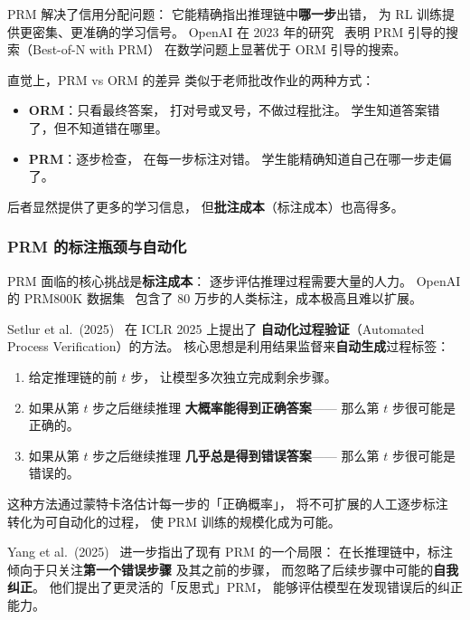 PRM 解决了信用分配问题：
它能精确指出推理链中\textbf{哪一步}出错，
为 RL 训练提供更密集、更准确的学习信号。
OpenAI 在 2023 年的研究~\cite{lightman2024lets}
表明 PRM 引导的搜索（Best-of-N with PRM）
在数学问题上显著优于 ORM 引导的搜索。

\begin{whybox}
直觉上，PRM vs ORM 的差异
类似于老师批改作业的两种方式：
\begin{itemize}[noitemsep]
  \item \textbf{ORM}：只看最终答案，
        打对号或叉号，不做过程批注。
        学生知道答案错了，但不知道错在哪里。
  \item \textbf{PRM}：逐步检查，
        在每一步标注对错。
        学生能精确知道自己在哪一步走偏了。
\end{itemize}
后者显然提供了更多的学习信息，
但\textbf{批注成本}（标注成本）也高得多。
\end{whybox}

\subsubsection{PRM 的标注瓶颈与自动化}

PRM 面临的核心挑战是\textbf{标注成本}：
逐步评估推理过程需要大量的人力。
OpenAI 的 PRM800K 数据集~\cite{lightman2024lets}
包含了 80 万步的人类标注，成本极高且难以扩展。

Setlur et al.\ (2025)~\cite{setlur2025rewarding}
在 ICLR 2025 上提出了
\textbf{自动化过程验证}（Automated Process Verification）的方法。
核心思想是利用结果监督来\textbf{自动生成}过程标签：
\begin{enumerate}[noitemsep]
  \item 给定推理链的前 $t$ 步，
        让模型多次独立完成剩余步骤。
  \item 如果从第 $t$ 步之后继续推理
        \textbf{大概率能得到正确答案}——
        那么第 $t$ 步很可能是正确的。
  \item 如果从第 $t$ 步之后继续推理
        \textbf{几乎总是得到错误答案}——
        那么第 $t$ 步很可能是错误的。
\end{enumerate}
这种方法通过蒙特卡洛估计每一步的「正确概率」，
将不可扩展的人工逐步标注
转化为可自动化的过程，
使 PRM 训练的规模化成为可能。

Yang et al.\ (2025)~\cite{yang2025beyond}
进一步指出了现有 PRM 的一个局限：
在长推理链中，标注倾向于只关注\textbf{第一个错误步骤}
及其之前的步骤，
而忽略了后续步骤中可能的\textbf{自我纠正}。
他们提出了更灵活的「反思式」PRM，
能够评估模型在发现错误后的纠正能力。

